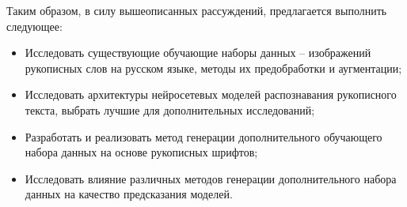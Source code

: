 Таким образом, в силу вышеописанных рассуждений, предлагается выполнить следующее:
\begin{itemize}
    \item Исследовать существующие обучающие наборы данных -- изображений рукописных слов на русском языке, методы их предобработки и аугментации;
    \item Исследовать архитектуры нейросетевых моделей распознавания рукописного текста, выбрать лучшие для дополнительных исследований;
    \item Разработать и реализовать метод генерации дополнительного обучающего набора данных на основе рукописных шрифтов;
    \item Исследовать влияние различных методов генерации дополнительного набора данных на качество предсказания моделей.
\end{itemize}
